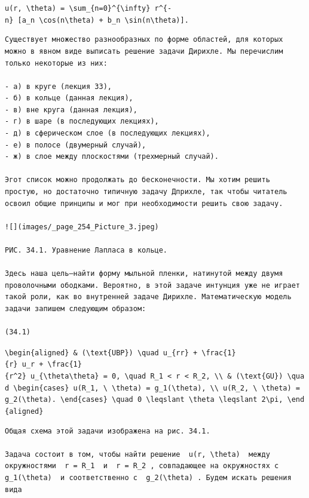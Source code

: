 \documentclass[
  ukrainian,
]{article}
\begin{document}
\texttt{u(r,\ \textbackslash{}theta)\ =\ \textbackslash{}sum\_\{n=0\}\^{}\{\textbackslash{}infty\}\ r\^{}\{-n\}\ {[}a\_n\ \textbackslash{}cos(n\textbackslash{}theta)\ +\ b\_n\ \textbackslash{}sin(n\textbackslash{}theta){]}.}

\begin{verbatim}
Существует множество разнообразных по форме областей, для которых можно в явном виде выписать решение задачи Дирихле. Мы перечислим только некоторые из них:

- а) в круге (лекция 33),
- б) в кольце (данная лекция),
- в) вне круга (данная лекция),
- г) в шаре (в последующих лекциях),
- д) в сферическом слое (в последующих лекциях),
- е) в полосе (двумерный случай),
- ж) в слое между плоскостями (трехмерный случай).

Эгот список можно продолжать до бесконечности. Мы хотим решить простую, но достаточно типичную задачу Дприхле, так чтобы читатель освоил общие принципы и мог при необходимости решить свою задачу.

![](images/_page_254_Picture_3.jpeg)

РИС. 34.1. Уравнение Лапласа в кольце.

Здесь наша цель—найти форму мыльной пленки, натинутой между двумя проволочными ободками. Вероятно, в этой задаче интунция уже не играет такой роли, как во внутренней задаче Дирихле. Математическую модель задачи запишем следующим образом:

(34.1)
\end{verbatim}

\texttt{\textbackslash{}begin\{aligned\}\ \&\ (\textbackslash{}text\{UBP\})\ \textbackslash{}quad\ u\_\{rr\}\ +\ \textbackslash{}frac\{1\}\{r\}\ u\_r\ +\ \textbackslash{}frac\{1\}\{r\^{}2\}\ u\_\{\textbackslash{}theta\textbackslash{}theta\}\ =\ 0,\ \textbackslash{}quad\ R\_1\ \textless{}\ r\ \textless{}\ R\_2,\ \textbackslash{}\textbackslash{}\ \&\ (\textbackslash{}text\{GU\})\ \textbackslash{}quad\ \textbackslash{}begin\{cases\}\ u(R\_1,\ \textbackslash{}\ \textbackslash{}theta)\ =\ g\_1(\textbackslash{}theta),\ \textbackslash{}\textbackslash{}\ u(R\_2,\ \textbackslash{}\ \textbackslash{}theta)\ =\ g\_2(\textbackslash{}theta).\ \textbackslash{}end\{cases\}\ \textbackslash{}quad\ 0\ \textbackslash{}leqslant\ \textbackslash{}theta\ \textbackslash{}leqslant\ 2\textbackslash{}pi,\ \textbackslash{}end\{aligned\}}

\begin{verbatim}
Общая схема этой задачи изображена на рис. 34.1.

Задача состоит в том, чтобы найти решение  u(r, \theta)  между окружностями  r = R_1  и  r = R_2 , совпадающее на окружностях с  g_1(\theta)  и соответственно с  g_2(\theta) . Будем искать решения вида
\end{verbatim}
\end{document}
